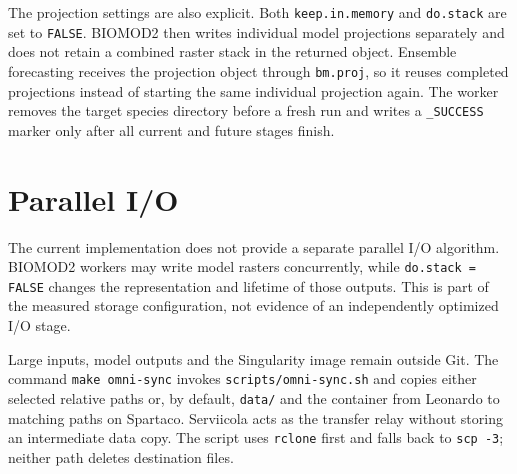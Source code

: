 The projection settings are also explicit. Both \texttt{keep.in.memory} and \texttt{do.stack} are set to \texttt{FALSE}. BIOMOD2 then writes individual model projections separately and does not retain a combined raster stack in the returned object. Ensemble forecasting receives the projection object through \texttt{bm.proj}, so it reuses completed projections instead of starting the same individual projection again. The worker removes the target species directory before a fresh run and writes a \texttt{\_SUCCESS} marker only after all current and future stages finish.

\section{Parallel I/O}

The current implementation does not provide a separate parallel I/O algorithm. BIOMOD2 workers may write model rasters concurrently, while \texttt{do.stack = FALSE} changes the representation and lifetime of those outputs. This is part of the measured storage configuration, not evidence of an independently optimized I/O stage.

Large inputs, model outputs and the Singularity image remain outside Git. The command \texttt{make omni-sync} invokes \nolinkurl{scripts/omni-sync.sh} and copies either selected relative paths or, by default, \texttt{data/} and the container from Leonardo to matching paths on Spartaco. Serviicola acts as the transfer relay without storing an intermediate data copy. The script uses \texttt{rclone} first and falls back to \texttt{scp -3}; neither path deletes destination files.


